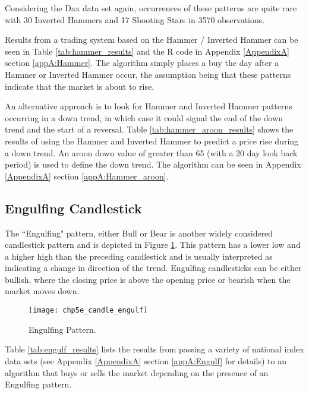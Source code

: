 Considering the Dax data set again, occurrences of these patterns are quite rare with 30 Inverted Hammers and 17 Shooting Stars in 3570 observations.

Results from a trading system based on the Hammer / Inverted Hammer can be seen in Table \ref{tab:hammer_results} and the R code in Appendix \ref{AppendixA} section \ref{appA:Hammer}. The algorithm simply places a buy the day after a Hammer or Inverted Hammer occur, the assumption being that these patterns indicate that the market is about to rise.




An alternative approach is to look for Hammer and Inverted Hammer patterns occurring in a down trend, in which case it could signal the end of the down trend and the start of a reversal. Table \ref{tab:hammer_aroon_results} shows the results of using the Hammer and Inverted Hammer to predict a price rise during a down trend. An aroon down value of greater than 65 (with a 20 day look back period) is used to define the down trend. The algorithm can be seen in Appendix \ref{AppendixA} section \ref{appA:Hammer_aroon}.  




\subsection{Engulfing Candlestick}
\label{sec:eng_cand}
The \textquotedblleft Engulfing" pattern, either Bull or Bear is another widely considered candlestick pattern and is depicted in Figure \ref{fig:chp5e:engulf}. This pattern has a lower low and a higher high than the preceding candlestick and is usually interpreted as indicating a change in direction of the trend. Engulfing candlesticks can be either bullish, where the closing price is above the opening price or bearish when the market moves down.

\begin{figure}[tbph]
\centering
\texttt{[image: chp5e\_candle\_engulf]}
\caption[ Engulfing Pattern.]{Engulfing Pattern.}
\label{fig:chp5e:engulf}
\end{figure}

Table \ref{tab:engulf_results} lists the results from passing a variety of national index data sets (see Appendix \ref{AppendixA} section \ref{appA:Engulf} for details) to an algorithm that buys or sells the market depending on the presence of an Engulfing pattern.


